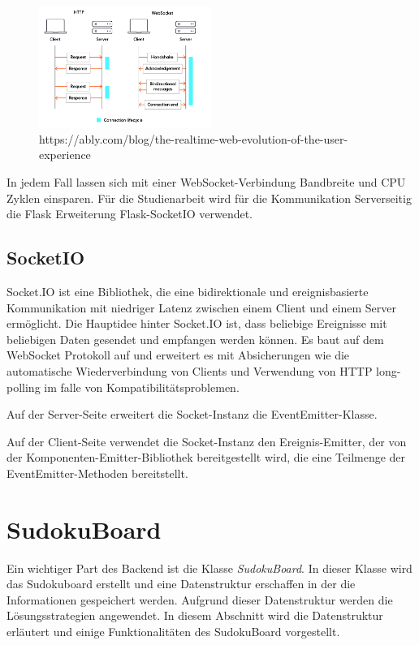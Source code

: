 \begin{figure}[htbp]
	\centering
	\includegraphics[width=0.5\textwidth]{images/Websocket.png}
	\caption{https://ably.com/blog/the-realtime-web-evolution-of-the-user-experience}
	\label{fig:VergleichWeb}
\end{figure}

In jedem Fall lassen sich mit einer WebSocket-Verbindung Bandbreite und CPU Zyklen einsparen. Für die Studienarbeit wird für die Kommunikation Serverseitig die Flask Erweiterung Flask-SocketIO verwendet.

\subsection{SocketIO}

Socket.IO ist eine Bibliothek, die eine bidirektionale und ereignisbasierte Kommunikation mit niedriger Latenz zwischen einem Client und einem Server ermöglicht. Die Hauptidee hinter Socket.IO ist, dass beliebige Ereignisse mit beliebigen Daten gesendet und empfangen werden können. Es baut auf dem WebSocket Protokoll auf und erweitert es mit Absicherungen wie die automatische Wiederverbindung von Clients und Verwendung von HTTP long-polling im falle von Kompatibilitätsproblemen.

Auf der Server-Seite erweitert die Socket-Instanz die EventEmitter-Klasse.

Auf der Client-Seite verwendet die Socket-Instanz den Ereignis-Emitter, der von der Komponenten-Emitter-Bibliothek bereitgestellt wird, die eine Teilmenge der EventEmitter-Methoden bereitstellt.

\section{SudokuBoard}

Ein wichtiger Part des Backend ist die Klasse \textit{SudokuBoard}. In dieser Klasse wird das Sudokuboard erstellt und eine Datenstruktur erschaffen in der die Informationen gespeichert werden. Aufgrund dieser Datenstruktur werden die Lösungsstrategien angewendet. In diesem Abschnitt wird die Datenstruktur erläutert und einige Funktionalitäten des SudokuBoard vorgestellt.

